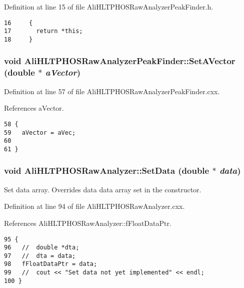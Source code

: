 Definition at line 15 of file Ali\-HLTPHOSRaw\-Analyzer\-Peak\-Finder.h.

\footnotesize\begin{verbatim}16     {
17       return *this; 
18     }
\end{verbatim}\normalsize 


\subsubsection{\setlength{\rightskip}{0pt plus 5cm}void Ali\-HLTPHOSRaw\-Analyzer\-Peak\-Finder::Set\-AVector (double $\ast$ {\em a\-Vector})}\label{classAliHLTPHOSRawAnalyzerPeakFinder_AliHLTPHOSRawAnalyzerPeakFindera5}




Definition at line 57 of file Ali\-HLTPHOSRaw\-Analyzer\-Peak\-Finder.cxx.

References a\-Vector.

\footnotesize\begin{verbatim}58 {
59   aVector = aVec;
60 
61 }
\end{verbatim}\normalsize 


\subsubsection{\setlength{\rightskip}{0pt plus 5cm}void Ali\-HLTPHOSRaw\-Analyzer::Set\-Data (double $\ast$ {\em data})\hspace{0.3cm}{\tt  [inherited]}}\label{classAliHLTPHOSRawAnalyzer_AliHLTPHOSRawAnalyzerPeakFindera12}


Set data array. Overrides data data array set in the constructor. 

Definition at line 94 of file Ali\-HLTPHOSRaw\-Analyzer.cxx.

References Ali\-HLTPHOSRaw\-Analyzer::f\-Float\-Data\-Ptr.

\footnotesize\begin{verbatim}95 {
96   //  double *dta;
97   //  dta = data;
98   fFloatDataPtr = data;
99   //  cout << "Set data not yet implemented" << endl;
100 }
\end{verbatim}\normalsize 



